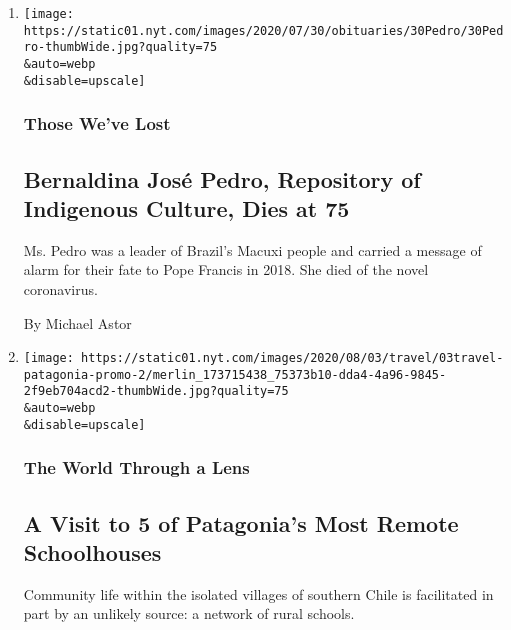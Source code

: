 \begin{enumerate}
\def\labelenumi{\arabic{enumi}.}
\item
  \href{/2020/08/03/obituaries/bernaldina-jose-pedro-dead-coronavirus.html}{}

  \texttt{[image: https://static01.nyt.com/images/2020/07/30/obituaries/30Pedro/30Pedro-thumbWide.jpg?quality=75\\\&auto=webp\\\&disable=upscale]}

  \hypertarget{those-weve-lost}{%
  \subsubsection{Those We've Lost}\label{those-weve-lost}}

  \hypertarget{bernaldina-josuxe9-pedro-repository-of-indigenous-culture-dies-at-75}{%
  \subsection{Bernaldina José Pedro, Repository of Indigenous Culture,
  Dies at
  75}\label{bernaldina-josuxe9-pedro-repository-of-indigenous-culture-dies-at-75}}

  Ms. Pedro was a leader of Brazil's Macuxi people and carried a message
  of alarm for their fate to Pope Francis in 2018. She died of the novel
  coronavirus.

  By Michael Astor
\item
  \href{/2020/08/03/travel/remote-schools-patagonia.html}{}

  \texttt{[image: https://static01.nyt.com/images/2020/08/03/travel/03travel-patagonia-promo-2/merlin\_173715438\_75373b10-dda4-4a96-9845-2f9eb704acd2-thumbWide.jpg?quality=75\\\&auto=webp\\\&disable=upscale]}

  \hypertarget{the-world-through-a-lens}{%
  \subsubsection{The World Through a
  Lens}\label{the-world-through-a-lens}}

  \hypertarget{a-visit-to-5-of-patagonias-most-remote-schoolhouses}{%
  \subsection{A Visit to 5 of Patagonia's Most Remote
  Schoolhouses}\label{a-visit-to-5-of-patagonias-most-remote-schoolhouses}}

  Community life within the isolated villages of southern Chile is
  facilitated in part by an unlikely source: a network of rural schools.


\end{enumerate}
